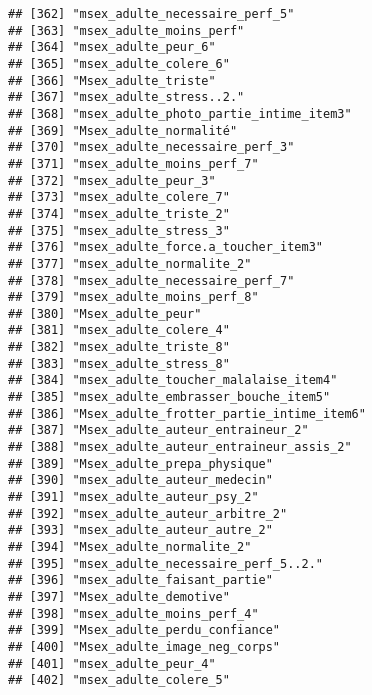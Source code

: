 \documentclass[
]{article}
\begin{document}
\begin{verbatim}
## [362] "msex_adulte_necessaire_perf_5"                       
## [363] "msex_adulte_moins_perf"                              
## [364] "msex_adulte_peur_6"                                  
## [365] "msex_adulte_colere_6"                                
## [366] "Msex_adulte_triste"                                  
## [367] "msex_adulte_stress..2."                              
## [368] "msex_adulte_photo_partie_intime_item3"               
## [369] "Msex_adulte_normalité"                               
## [370] "msex_adulte_necessaire_perf_3"                       
## [371] "msex_adulte_moins_perf_7"                            
## [372] "msex_adulte_peur_3"                                  
## [373] "msex_adulte_colere_7"                                
## [374] "msex_adulte_triste_2"                                
## [375] "msex_adulte_stress_3"                                
## [376] "msex_adulte_force.a_toucher_item3"                   
## [377] "msex_adulte_normalite_2"                             
## [378] "msex_adulte_necessaire_perf_7"                       
## [379] "msex_adulte_moins_perf_8"                            
## [380] "Msex_adulte_peur"                                    
## [381] "msex_adulte_colere_4"                                
## [382] "msex_adulte_triste_8"                                
## [383] "msex_adulte_stress_8"                                
## [384] "msex_adulte_toucher_malalaise_item4"                 
## [385] "msex_adulte_embrasser_bouche_item5"                  
## [386] "Msex_adulte_frotter_partie_intime_item6"             
## [387] "Msex_adulte_auteur_entraineur_2"                     
## [388] "msex_adulte_auteur_entraineur_assis_2"               
## [389] "Msex_adulte_prepa_physique"                          
## [390] "msex_adulte_auteur_medecin"                          
## [391] "msex_adulte_auteur_psy_2"                            
## [392] "msex_adulte_auteur_arbitre_2"                        
## [393] "msex_adulte_auteur_autre_2"                          
## [394] "Msex_adulte_normalite_2"                             
## [395] "msex_adulte_necessaire_perf_5..2."                   
## [396] "msex_adulte_faisant_partie"                          
## [397] "Msex_adulte_demotive"                                
## [398] "msex_adulte_moins_perf_4"                            
## [399] "Msex_adulte_perdu_confiance"                         
## [400] "Msex_adulte_image_neg_corps"                         
## [401] "msex_adulte_peur_4"                                  
## [402] "msex_adulte_colere_5"                                

\end{verbatim}
\end{document}
